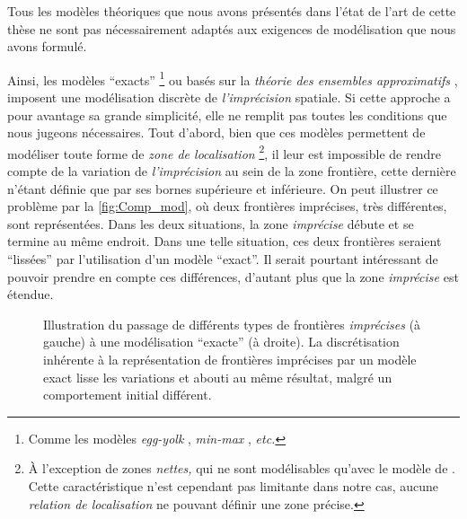 Tous les modèles théoriques que nous avons présentés dans l'état de
l'art de cette thèse ne sont pas nécessairement adaptés aux exigences
de modélisation que nous avons formulé.

Ainsi, les modèles \enquote{exacts} \footnote{Comme les modèles
  \emph{egg-yolk} \autocite{Cohn1996}, \emph{min-max}
  \autocite{Clementini1996}, \emph{etc.}} ou basés sur la
\emph{théorie des ensembles approximatifs} \autocite{Pawlak1982},
imposent une modélisation discrète de \emph{l'imprécision}
spatiale. Si cette approche a pour avantage sa grande simplicité, elle
ne remplit pas toutes les conditions que nous jugeons
nécessaires. Tout d'abord, bien que ces modèles permettent de
modéliser toute forme de \emph{zone de localisation} \footnote{À
  l'exception de zones \emph{nettes,} qui ne sont modélisables qu'avec
  le modèle de \textcite{Bejaoui2009}. Cette caractéristique n'est
  cependant pas limitante dans notre cas, aucune \emph{relation de
    localisation} ne pouvant définir une zone précise.}, il leur est
impossible de rendre compte de la variation de \emph{l'imprécision} au
sein de la zone frontière, cette dernière n'étant définie que par ses
bornes supérieure et inférieure. On peut illustrer ce problème par la
\autoref{fig:Comp_mod}, où deux frontières imprécises, très
différentes, sont représentées. Dans les deux situations, la zone
\emph{imprécise} débute et se termine au même endroit. Dans une telle
situation, ces deux frontières seraient \enquote{lissées} par
l'utilisation d'un modèle \enquote{exact}. Il serait pourtant
intéressant de pouvoir prendre en compte ces différences, d'autant
plus que la zone \emph{imprécise} est étendue.

\begin{figure}[hb]
  \centering 
  \caption[Illustration du passage de différents types de frontières
  \emph{imprécises} à une modélisation \enquote{exacte}]{Illustration
    du passage de différents types de frontières \emph{imprécises} (à
    gauche) à une modélisation \enquote{exacte} (à droite). La
    discrétisation inhérente à la représentation de frontières
    imprécises par un modèle exact lisse les variations et abouti au
    même résultat, malgré un comportement initial différent.}
  \label{fig:Comp_mod}
\end{figure}

